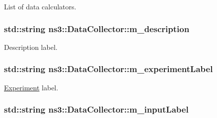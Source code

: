 List of data calculators. 

\subsubsection[{\texorpdfstring{m\+\_\+description}{m_description}}]{\setlength{\rightskip}{0pt plus 5cm}std\+::string ns3\+::\+Data\+Collector\+::m\+\_\+description\hspace{0.3cm}{\ttfamily [private]}}\hypertarget{classns3_1_1DataCollector_a4cfaabd5ffe20981f4d81a6f4fef30ed}{}\label{classns3_1_1DataCollector_a4cfaabd5ffe20981f4d81a6f4fef30ed}


Description label. 

\subsubsection[{\texorpdfstring{m\+\_\+experiment\+Label}{m_experimentLabel}}]{\setlength{\rightskip}{0pt plus 5cm}std\+::string ns3\+::\+Data\+Collector\+::m\+\_\+experiment\+Label\hspace{0.3cm}{\ttfamily [private]}}\hypertarget{classns3_1_1DataCollector_a42c9a3508fea2108614068e5c0b4abf1}{}\label{classns3_1_1DataCollector_a42c9a3508fea2108614068e5c0b4abf1}


\hyperlink{classExperiment}{Experiment} label. 

\subsubsection[{\texorpdfstring{m\+\_\+input\+Label}{m_inputLabel}}]{\setlength{\rightskip}{0pt plus 5cm}std\+::string ns3\+::\+Data\+Collector\+::m\+\_\+input\+Label\hspace{0.3cm}{\ttfamily [private]}}\hypertarget{classns3_1_1DataCollector_a5315c1fced751d57731b7b82cb933d7e}{}\label{classns3_1_1DataCollector_a5315c1fced751d57731b7b82cb933d7e}


